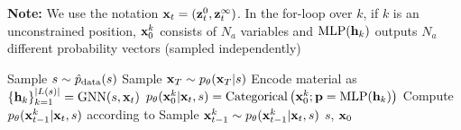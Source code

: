 \begin{algorithm}[tb]
   \caption{\ourmodel}
   \label{algo:wyckoffdiff}
   \hspace*{\algorithmicindent} \textbf{Note:} We use the notation ${{\mathbf{x}}_t} = ({\mathbf{z}}^{0}_t, {\mathbf{z}}^{\infty}_t)$. In the for-loop over $k$, if $k$ is an unconstrained position, ${\mathbf{x}}_0^k$ consists of $N_a$ variables and $\operatorname{MLP}({\mathbf{h}}_k)$ outputs $N_a$ different probability vectors (sampled independently)
\begin{algorithmic}
\STATE Sample $s \sim \hat{p}_{\rm{data}}(s)$
\STATE Sample ${{\mathbf{x}}_{T}} \sim p_\theta({{\mathbf{x}}_{T}} | s)$
\STATE Encode material as $\{{\mathbf{h}}_k\}_{k=1}^{|L(s)|} = \text{GNN}(s, {{\mathbf{x}}_t})$ 
\STATE $p_\theta({\mathbf{x}}_0^k | {{\mathbf{x}}_t}, s) = \text{Categorical}\left({\mathbf{x}}_0^k;{\mathbf{p}}=\operatorname{MLP}({\mathbf{h}}_k)\right)$
\STATE Compute $p_\theta({\mathbf{x}}_{t-1}^k|{{\mathbf{x}}_t},s)$ according to 
\STATE Sample ${\mathbf{x}}_{t-1}^k \sim p_\theta({\mathbf{x}}_{t-1}^k|{{\mathbf{x}}_t},s)$
\ENDFOR
\ENDFOR
\RETURN $s$, ${\mathbf{x}}_0$
\end{algorithmic}
\end{algorithm}
